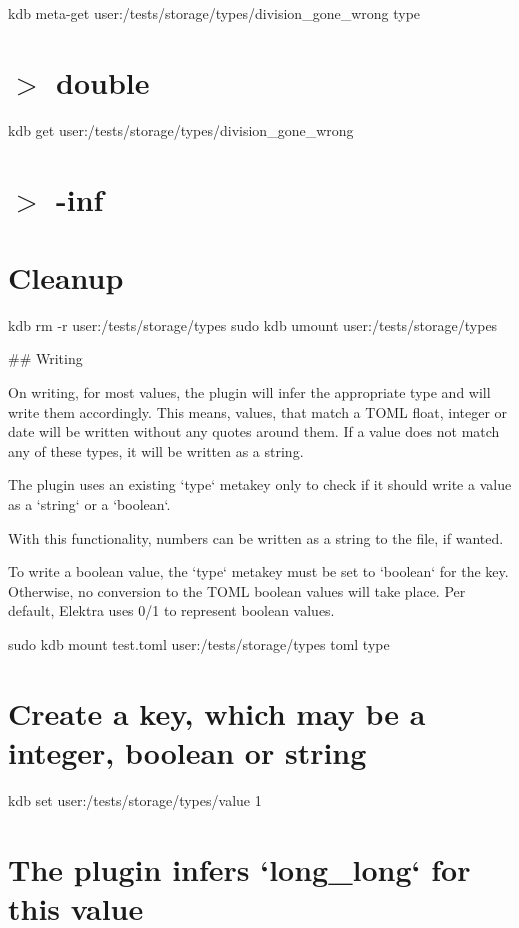 kdb meta-\/get \textquotesingle{}user\+:/tests/storage/types/division\+\_\+gone\+\_\+wrong\textquotesingle{} \textquotesingle{}type\textquotesingle{} \hypertarget{autotoc_md635_autotoc_md653}{}\section{$>$ double}\label{autotoc_md635_autotoc_md653}
kdb get \textquotesingle{}user\+:/tests/storage/types/division\+\_\+gone\+\_\+wrong\textquotesingle{} \hypertarget{autotoc_md635_autotoc_md654}{}\section{$>$ -\/inf}\label{autotoc_md635_autotoc_md654}
\hypertarget{autotoc_md635_autotoc_md655}{}\section{Cleanup}\label{autotoc_md635_autotoc_md655}
kdb rm -\/r user\+:/tests/storage/types sudo kdb umount user\+:/tests/storage/types 
\begin{DoxyCode}
## Writing

On writing, for most values, the plugin will infer the appropriate type and will write them accordingly.
This means, values, that match a TOML float, integer or date will be written without any quotes around
       them.
If a value does not match any of these types, it will be written as a string.

The plugin uses an existing `type` metakey only to check if it should write a value as a `string` or a
       `boolean`.

With this functionality, numbers can be written as a string to the file, if wanted.

To write a boolean value, the `type` metakey must be set to `boolean` for the key.
Otherwise, no conversion to the TOML boolean values will take place.
Per default, Elektra uses 0/1 to represent boolean values.
\end{DoxyCode}
 sudo kdb mount test.\+toml user\+:/tests/storage/types toml type\hypertarget{autotoc_md635_autotoc_md656}{}\section{Create a key, which may be a integer, boolean or string}\label{autotoc_md635_autotoc_md656}
kdb set \textquotesingle{}user\+:/tests/storage/types/value\textquotesingle{} \textquotesingle{}1\textquotesingle{}\hypertarget{autotoc_md635_autotoc_md657}{}\section{The plugin infers `long\+\_\+long` for this value}\label{autotoc_md635_autotoc_md657}
